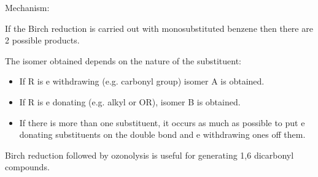 
Mechanism:


If the Birch reduction is carried out with monosubstituted benzene then there are 2 possible products.


The isomer obtained depends on the nature of the substituent:
\begin{itemize}
  \item If R is e\super{--} withdrawing (e.g. carbonyl group) isomer A is obtained.
  \item If R is e\super{--} donating (e.g. alkyl or OR), isomer B is obtained.
  \item If there is more than one substituent, it occurs as much as possible to put e\super{--} donating substituents on the double bond and e\super{--} withdrawing ones off them.
\end{itemize}


Birch reduction followed by ozonolysis is useful for generating 1,6 dicarbonyl compounds.


